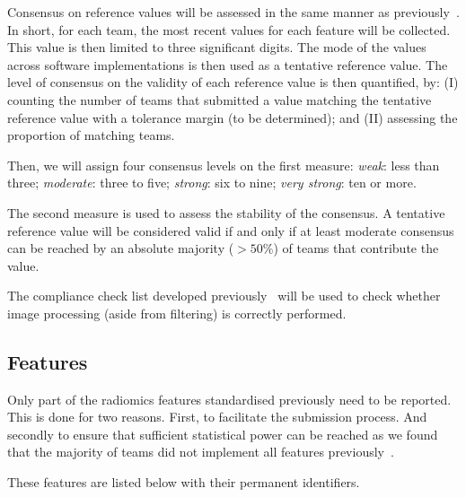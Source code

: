 \documentclass[fleqn,a4paper,oneside,openany]{book}
\begin{document}
Consensus on reference values will be assessed in the same manner as previously~\cite{Zwanenburg2020-jt}. In short, for each team, the most recent values for each feature will be collected. This value is then limited to three significant digits. The mode of the values across software implementations is then used as a tentative reference value. The level of consensus on the validity of each reference value is then quantified, by: (I) counting the number of teams that submitted a value matching the tentative reference value with a tolerance margin (to be determined); and (II) assessing the proportion of matching teams.

Then, we will assign four consensus levels on the first measure: \textit{weak}: less than three; \textit{moderate}: three to five; \textit{strong}: six to nine; \textit{very strong}: ten or more.

The second measure is used to assess the stability of the consensus. A tentative reference value will be considered valid if and only if at least moderate consensus can be reached by an absolute majority (\(>50\%\)) of teams that contribute the value.

The compliance check list developed previously~\cite{Zwanenburg2020-jt} will be used to check whether image processing (aside from filtering) is correctly performed.
%
\subsection{Features}\label{sec:radiomicsfeaturesbenchmarking}
%
Only part of the radiomics features standardised previously need to be reported. This is done for two reasons. First, to facilitate the submission process. And secondly to ensure that sufficient statistical power can be reached as we found that the majority of teams did not implement all features previously~\cite{Zwanenburg2020-jt}.

These features are listed below with their permanent identifiers.
\end{document}
